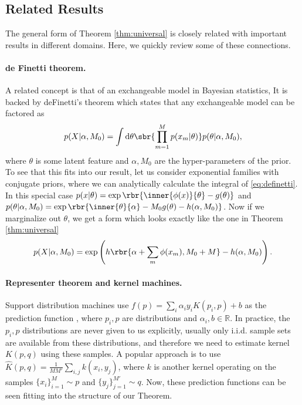 \documentclass{article}
\newcommand{\refthm}[1]{Theorem \ref{#1}}
\begin{document}
\subsection{Related Results}\label{sec:rel-res}
The general form of \refthm{thm:universal} is closely related with important results in different domains. Here, we quickly review some of these connections.
\paragraph{de Finetti theorem.}
A related concept is that of an exchangeable model in Bayesian statistics, It is backed by deFinetti's theorem which states that any exchangeable model can be factored as
\begin{equation}
  \label{eq:definetti}
  p(X|\alpha, M_0) = \int \mathrm{d}\theta \sbr{\prod_{m=1}^M p(x_m|\theta)} p(\theta|\alpha, M_0), 
\end{equation}
where $\theta$ is some latent feature and $\alpha, M_0$ are the hyper-parameters of the prior. To see that this fits into our result, let us consider exponential families with conjugate priors, where we can analytically calculate the integral of \eqref{eq:definetti}. In this special case $p(x|\theta) = \exp\rbr{\inner{\phi(x)}{\theta} - g(\theta)}$ and $p(\theta|\alpha, M_0) = \exp\rbr{\inner{\theta}{\alpha} - M_0
  g(\theta)- h(\alpha, M_0)}$.
Now if we marginalize out $\theta$, we get a form which looks exactly like the one in \refthm{thm:universal}
\begin{equation}
  p(X|\alpha, M_0) = \exp\left( h\rbr{\alpha + \sum_{m} \phi(x_m), M_0 + M} - h(\alpha,
  M_0)\right).
\end{equation}

\paragraph{Representer theorem and kernel machines.}
Support distribution machines use $f(p) = \sum_i \alpha_i y_i K(p_i,p) + b$ as the prediction function \cite{muandet12NIPS,poczos12SDM},
where $p_i,p$ are distributions and $\alpha_i,b \in \mathbb{R}$. 
In practice, the $p_i,p$ distributions are never given to us explicitly, usually only i.i.d. sample sets are available from these distributions, and therefore we need to estimate kernel $K(p,q)$ using these samples. A popular approach is to use $\hat K(p,q)=\frac{1}{MM'} \sum_{i,j} k(x_i,y_j)$, where $k$ is another kernel operating on the samples $\{x_i\}_{i=1}^M\sim p$ and $\{y_j\}_{j=1}^{M'}\sim q$. Now, these prediction functions can be seen fitting into the structure of our Theorem.
\end{document}
